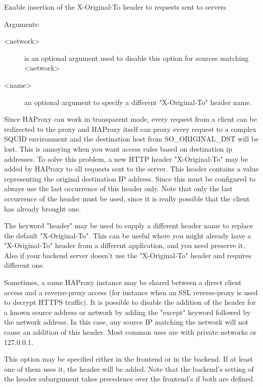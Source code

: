 {

  Enable insertion of the X-Original-To header to requests sent to servers


  Arguments:
\begin{description}
\item[<network>] is an optional argument used to disable this option for sources
              matching <network>
\item[<name>] an optional argument to specify a different "X-Original-To"
              header name.
\end{description}

  Since HAProxy can work in transparent mode, every request from a client can
  be redirected to the proxy and HAProxy itself can proxy every request to a
  complex SQUID environment and the destination host from SO\_ORIGINAL\_DST will
  be lost. This is annoying when you want access rules based on destination ip
  addresses. To solve this problem, a new HTTP header "X-Original-To" may be
  added by HAProxy to all requests sent to the server. This header contains a
  value representing the original destination IP address. Since this must be
  configured to always use the last occurrence of this header only. Note that
  only the last occurrence of the header must be used, since it is really
  possible that the client has already brought one.

  The keyword "header" may be used to supply a different header name to replace
  the default "X-Original-To". This can be useful where you might already
  have a "X-Original-To" header from a different application, and you need
  preserve it. Also if your backend server doesn't use the "X-Original-To"
  header and requires different one.

  Sometimes, a same HAProxy instance may be shared between a direct client
  access and a reverse-proxy access (for instance when an SSL reverse-proxy is
  used to decrypt HTTPS traffic). It is possible to disable the addition of the
  header for a known source address or network by adding the "except" keyword
  followed by the network address. In this case, any source IP matching the
  network will not cause an addition of this header. Most common uses are with
  private networks or 127.0.0.1.

  This option may be specified either in the frontend or in the backend. If at
  least one of them uses it, the header will be added. Note that the backend's
  setting of the header subargument takes precedence over the frontend's if
  both are defined.

}

